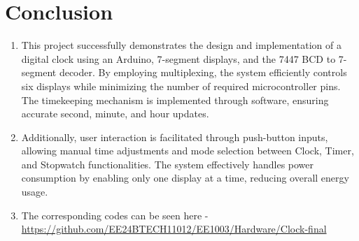 \documentclass[journal]{IEEEtran}
\begin{document}
\section{Conclusion}
\begin{enumerate}
\item This project successfully demonstrates the design and implementation of a digital clock using an Arduino, 7-segment displays, and the 7447 BCD to 7-segment decoder. By employing multiplexing, the system efficiently controls six displays while minimizing the number of required microcontroller pins. The timekeeping mechanism is implemented through software, ensuring accurate second, minute, and hour updates.
\item Additionally, user interaction is facilitated through push-button inputs, allowing manual time adjustments and mode selection between Clock, Timer, and Stopwatch functionalities. The system effectively handles power consumption by enabling only one display at a time, reducing overall energy usage.
\item The corresponding codes can be seen here - \href{https://github.com/EE24BTECH11012/EE1003/tree/c55818859eebe407cd8a028f4a39012ec59f1942/Hardware/Clock-final}{https://github.com/EE24BTECH11012/EE1003/Hardware/Clock-final}
\end{enumerate}
\end{document}
